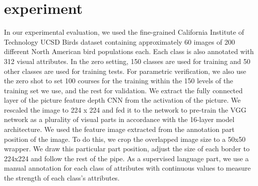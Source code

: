 \documentclass[10pt,twocolumn,letterpaper]{article}
\begin{document}
\section{experiment}
In our experimental evaluation, we used the fine-grained California Institute of Technology UCSD Birds dataset containing approximately 60 images of 200 different North American bird populations each. Each class is also annotated with 312 visual attributes. In the zero setting, 150 classes are used for training and 50 other classes are used for training tests. For parametric verification, we also use the zero shot to set 100 courses for the training within the 150 levels of the training set we use, and the rest for validation. We extract the fully connected layer of the picture feature depth CNN from the activation of the picture. We rescaled the image to 224 x 224 and fed it to the network to pre-train the VGG network as a plurality of visual parts in accordance with the 16-layer model architecture. We used the feature image extracted from the annotation part position of the image. To do this, we crop the overlapped image size to a 50x50 wrapper. We draw this particular part position, adjust the size of each border to 224x224 and follow the rest of the pipe. As a supervised language part, we use a manual annotation for each class of attributes with continuous values ​​to measure the strength of each class's attributes.
\end{document}

